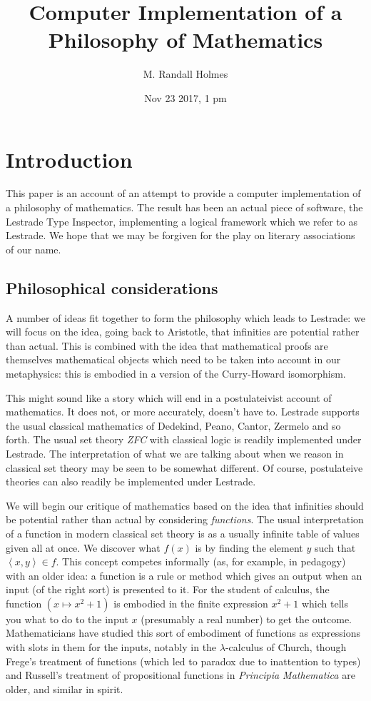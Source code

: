 \documentclass{article}
\title{Computer Implementation of a Philosophy of Mathematics}
\author{M. Randall Holmes}
\date{Nov 23 2017, 1 pm}
\begin{document}
\maketitle

\section{Introduction}

This paper is an account of an attempt to provide a computer implementation of a philosophy of mathematics.   The result has been an actual piece of software,
the Lestrade Type Inspector, implementing a logical framework which we refer to as Lestrade.  We hope that we may be forgiven for the play on literary associations of our name.

\tableofcontents

\subsection{Philosophical considerations}

A number of ideas fit together to form the philosophy which leads to Lestrade:  we will focus on the idea, going back to Aristotle, that infinities are potential rather than actual.   This is combined with the idea that mathematical proofs are themselves mathematical objects which need to be taken into account in our metaphysics:  this is embodied in a version of the Curry-Howard isomorphism.

This might sound like a story which will end in a postulateivist account of mathematics.  It does not, or more accurately, doesn't have to.  Lestrade supports the usual classical mathematics of Dedekind, Peano, Cantor, Zermelo and so forth.  The usual set theory {\em ZFC\/} with classical logic is readily implemented under Lestrade.  The interpretation of what we are talking about when we reason in classical set theory may be seen to be somewhat different.  Of course, postulateive theories can also readily be implemented under Lestrade.

We will begin our critique of mathematics based on the idea that infinities should be potential rather than actual by considering {\em functions\/}.  The usual interpretation of a function in modern classical set theory is as a usually infinite table of values given all at once.  We discover what $f(x)$ is by finding the element
$y$ such that $\left<x,y\right> \in f$.   This concept competes informally (as, for example, in pedagogy) with an older idea:  a function is a rule or method which gives an output when an input (of the right sort) is presented to it.   For the student of calculus, the function $(x \mapsto x^2+1)$ is embodied in the finite expression $x^2+1$ which tells you what to do to the input $x$ (presumably a real number) to get the outcome.  Mathematicians have studied this sort of embodiment of functions as expressions with slots in them for the inputs, notably in the $\lambda$-calculus of Church, though Frege's treatment of functions (which led to paradox due to inattention to types) and Russell's treatment of propositional functions in {\em Principia Mathematica\/} are older, and similar in spirit.
\end{document}
